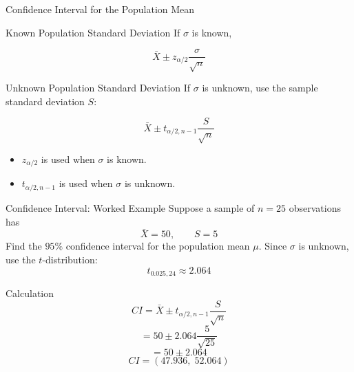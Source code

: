 \documentclass{beamer}
\begin{document}

\begin{frame}{Confidence Interval for the Population Mean}

\begin{block}{Known Population Standard Deviation}
If $\sigma$ is known,

\[
\boxed{
\bar X
\pm
z_{\alpha/2}\frac{\sigma}{\sqrt n}
}
\]
\end{block}

\begin{block}{Unknown Population Standard Deviation}
If $\sigma$ is unknown, use the sample standard deviation $S$:

\[
\boxed{
\bar X
\pm
t_{\alpha/2,n-1}\frac{S}{\sqrt n}
}
\]
\end{block}

\begin{itemize}
    \item $z_{\alpha/2}$ is used when $\sigma$ is known.
    \item $t_{\alpha/2,n-1}$ is used when $\sigma$ is unknown.
\end{itemize}

\end{frame}


\begin{frame}{Confidence Interval: Worked Example}
Suppose a sample of $n=25$ observations has
\[
\bar X=50,
\qquad
S=5
\]
Find the $95\%$ confidence interval for the population mean $\mu$.
Since $\sigma$ is unknown, use the $t$-distribution:
\[
t_{0.025,24}\approx2.064
\]
\begin{block}{Calculation}
\[
CI
=
\bar X
\pm
t_{\alpha/2,n-1}\frac{S}{\sqrt n}
\]
\[
=
50
\pm
2.064\frac{5}{\sqrt{25}}
\]
\[
=
50\pm2.064
\]
\[
\boxed{
CI=(47.936,\;52.064)
}
\]
\end{block}

\end{frame}

\end{document}
